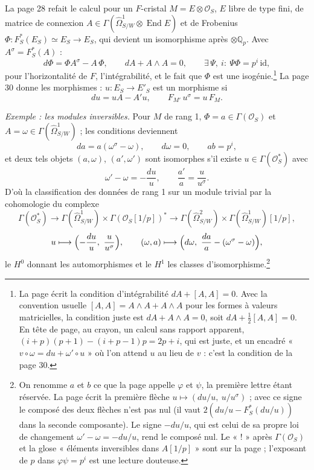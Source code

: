 \documentclass[11pt,a4paper]{article}
\begin{document}
La page 28 refait le calcul pour un $F$-cristal $M = E \otimes
\mathcal{O}_{S}$, $E$ libre de type fini, de matrice de connexion
$A \in \Gamma(\hat\Omega^{1}_{S/W} \otimes \operatorname{End} E)$ et de
Frobenius $\Phi\colon F_{S}^{*}(E_{S}) \simeq E_{S} \to E_{S}$, qui devient
un isomorphisme après $\otimes \mathbb{Q}_{p}$. Avec $A^{\sigma} =
F_{S}^{*}(A)$ :
\[
d\Phi = \Phi A^{\sigma} - A\,\Phi, \qquad dA + A \wedge A = 0, \qquad
\exists\,\Psi,\ i : \ \Psi\Phi = p^{i}\,\mathrm{id},
\]
pour l'horizontalité de $F$, l'intégrabilité, et le fait que $\Phi$ est une
isogénie.\footnote{La page écrit la condition d'intégrabilité
$dA + [A, A] = 0$. Avec la convention usuelle $[A, A] = A\wedge A + A \wedge
A$ pour les formes à valeurs matricielles, la condition juste est
$dA + A \wedge A = 0$, soit $dA + \tfrac12[A, A] = 0$. En tête de page, au
crayon, un calcul sans rapport apparent, $(i+p)(p+1) - (i+p-1)p = 2p + i$,
qui est juste, et un encadré « $v \circ \omega = du + \omega' \circ u$ » où
l'on attend $u$ au lieu de $v$ : c'est la condition de la page 30.} La page
30 donne les morphismes : $u\colon E_{S} \to E'_{S}$ est un morphisme si
\[
du = u A - A' u, \qquad F_{M'}\, u^{\sigma} = u\, F_{M} .
\]

\emph{Exemple : les modules inversibles.} Pour $M$ de rang 1, $\Phi =
a \in \Gamma(\mathcal{O}_{S})$ et $A = \omega \in
\Gamma(\hat\Omega^{1}_{S/W})$ ; les conditions deviennent
\[
da = a(\omega^{\sigma} - \omega), \qquad d\omega = 0,
\qquad ab = p^{i},
\]
et deux tels objets $(a, \omega)$, $(a', \omega')$ sont
isomorphes s'il existe $u \in \Gamma(\mathcal{O}_{S}^{*})$ avec
\[
\omega' - \omega = -\frac{du}{u}, \qquad \frac{a'}{a} =
\frac{u}{u^{\sigma}} .
\]
D'où la classification des données de rang 1 sur un module trivial par la
cohomologie du complexe
\[
\Gamma(\mathcal{O}_{S}^{*}) \longrightarrow \Gamma(\hat\Omega^{1}_{S/W})
\times \Gamma(\mathcal{O}_{S}[1/p])^{*} \longrightarrow
\Gamma(\hat\Omega^{2}_{S/W}) \times \Gamma(\hat\Omega^{1}_{S/W})[1/p],
\]
\[
u \longmapsto \Bigl(-\frac{du}{u},\ \frac{u}{u^{\sigma}}\Bigr), \qquad
(\omega, a) \longmapsto \Bigl(d\omega,\
\frac{da}{a} - (\omega^{\sigma} - \omega)\Bigr),
\]
le $H^{0}$ donnant les automorphismes et le $H^{1}$ les classes
d'isomorphisme.\footnote{On renomme $a$ et $b$ ce que la page appelle
$\varphi$ et $\psi$, la première lettre étant réservée. La page écrit la première flèche
$u \mapsto (du/u,\ u/u^{\sigma})$ ; avec ce signe le composé des deux
flèches n'est pas nul (il vaut $2(du/u - F_{S}^{*}(du/u))$ dans la seconde
composante). Le signe $-du/u$, qui est celui de sa propre loi de changement
$\omega' - \omega = -du/u$, rend le composé nul. Le « ! » après
$\Gamma(\mathcal{O}_{S})$ et la glose « éléments inversibles dans
$A[1/p]$ » sont sur la page ; l'exposant de $p$ dans $\varphi\psi = p^{i}$
est une lecture douteuse.}
\end{document}

